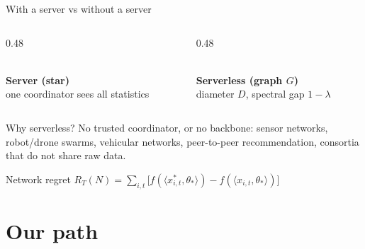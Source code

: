 \documentclass[11pt]{beamer}
\begin{document}
\begin{frame}{With a server vs without a server}
\small
\begin{columns}[T]
\begin{column}{0.48\textwidth}
\centering
{}\\[0.3em]
\textbf{Server (star)}\\
one coordinator sees all statistics
\end{column}
\begin{column}{0.48\textwidth}
\centering
{}\\[0.3em]
\textbf{Serverless (graph $G$)}\\
diameter $D$, spectral gap $1-\lambda$
\end{column}
\end{columns}
\vspace{0.6em}
\begin{block}{Why serverless?}
No trusted coordinator, or no backbone: sensor networks, robot/drone swarms, vehicular networks, peer-to-peer recommendation, consortia that do not share raw data.
\end{block}
\begin{center}
Network regret $R_T(N)=\sum_{i,t}\big[f(\langle x^*_{i,t},\theta_*\rangle)-f(\langle x_{i,t},\theta_*\rangle)\big]$
\end{center}
\end{frame}

\section{Our path}
\end{document}
